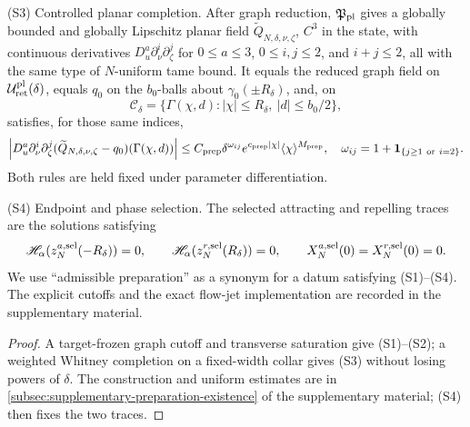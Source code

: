 \begin{definition}
\smallskip
\noindent\textup{(S3) Controlled planar completion.}
After graph reduction, \(\mathfrak P_{\rm pl}\) gives a globally bounded and
globally Lipschitz planar field \(\widetilde Q_{N,\delta,\nu,\zeta}\),
\(C^3\) in the state, with continuous derivatives
\(D_u^a\partial_\nu^i\partial_\zeta^j\) for
\(0\le a\le3\), \(0\le i,j\le2\), and \(i+j\le2\), all with the same
type of \(N\)-uniform tame bound.  It equals the reduced graph field on
\(\mathcal U^{\rm pl}_{\rm ret}(\delta)\), equals \(q_0\) on the
\(b_0\)-balls about \(\gamma_0(\pm R_\delta)\), and, on
\[
 \mathcal C_\delta
 =\{\Gamma(\chi,d):|\chi|\le R_\delta,\ |d|\le b_0/2\},
\]
satisfies, for those same indices,
\begin{equation}
 \left|D_u^a\partial_\nu^i\partial_\zeta^j
   (\widetilde Q_{N,\delta,\nu,\zeta}-q_0)
       (\Gamma(\chi,d))\right|
 \le C_{\rm prep}\delta^{\omega_{ij}}
       e^{c_{\rm prep}|\chi|}\langle\chi\rangle^{M_{\rm prep}},
 \quad
 \omega_{ij}=1+\mathbf1_{\{j\ge1\ {\rm or}\ i=2\}}.    \label{eq:planar-preparation-smallness}
\end{equation}
Both rules are held fixed under parameter differentiation.

\smallskip
\noindent\textup{(S4) Endpoint and phase selection.}
The selected attracting and repelling traces are the solutions satisfying
\[
 \mathscr H_\alpha(z^{a,\rm sel}_N(-R_\delta))=0,
 \qquad
 \mathscr H_\alpha(z^{r,\rm sel}_N(R_\delta))=0,
 \qquad
 X^{a,\rm sel}_N(0)=X^{r,\rm sel}_N(0)=0.
\]
We use ``admissible preparation'' as a synonym for a datum satisfying
\textup{(S1)}--\textup{(S4)}.  The explicit
cutoffs and the exact flow-jet implementation are recorded in the
supplementary material.
\end{definition}


\begin{proof}
A target-frozen graph cutoff and transverse saturation give
\textup{(S1)}--\textup{(S2)}; a weighted Whitney
completion on a fixed-width collar gives \textup{(S3)} without
losing powers of \(\delta\).  The construction and uniform estimates are in
\cref{subsec:supplementary-preparation-existence} of the supplementary
material; \textup{(S4)} then fixes the two traces.
\end{proof}

